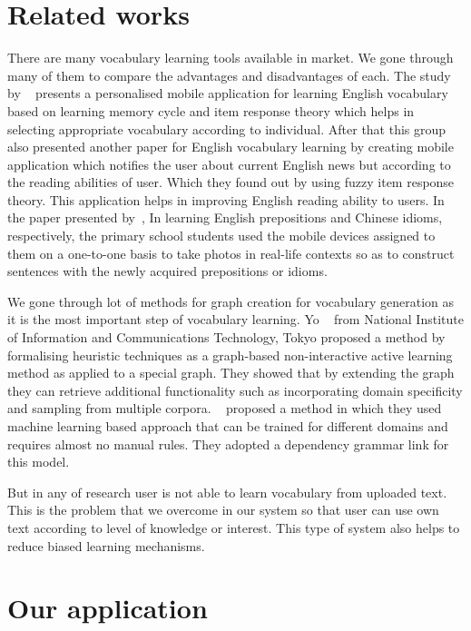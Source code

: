 \documentclass[11pt,a4paper]{article}
\begin{document}
\section{Related works}
There are many vocabulary learning tools available in market. We gone through many of them to compare the advantages and disadvantages of each. The study by ~\citet{chen2008personalized} presents a personalised mobile application for learning English vocabulary based on learning memory cycle and item response theory which helps in selecting appropriate vocabulary according to individual. After that this group also presented another paper for English vocabulary learning by creating mobile application which notifies the user about current English news but according to the reading abilities of user. Which they found out by using fuzzy item response theory. This application helps in improving English reading ability to users. In the paper presented by~\citet{wong2010mobile}, In learning English prepositions and Chinese idioms, respectively, the primary school students used the mobile devices assigned to them on a one-to-one basis to take photos in real-life contexts so as to construct sentences with the newly acquired prepositions or idioms. 

We gone through lot of methods for graph creation for vocabulary generation as it is the most important step of vocabulary learning. Yo ~\citet{ehara2014formalizing}  from National Institute of Information and Communications Technology, Tokyo proposed a method by formalising heuristic techniques as a graph-based non-interactive active learning method as applied to a special graph. They showed that by extending the graph they can retrieve additional functionality such as incorporating domain specificity and sampling from multiple corpora.
~\citet{zhang2001learning} proposed a method in which they used machine learning based approach that can be trained for different domains and requires almost no manual rules. They adopted a dependency grammar link for this model. 

But in any of research user is not able to learn vocabulary from uploaded text. This is the problem that we overcome in our system so that user can use own text according to level of knowledge or interest. This type of system also helps to reduce biased learning mechanisms.  


\section{Our application}
\end{document}
